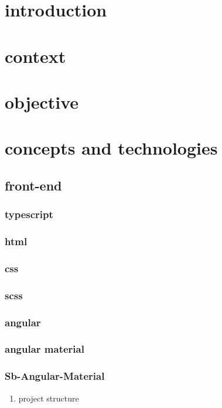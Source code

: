 \documentclass[11pt]{article}
\author{Hydrocat}
\date{\today}
\title{}
\begin{document}
\tableofcontents

\section{introduction}
\label{sec:org0f9d538}
\section{context}
\label{sec:org9407320}
\section{objective}
\label{sec:org6435aa1}
\section{concepts and technologies}
\label{sec:org521768a}
\subsection{front-end}
\label{sec:orgb0a4638}
\subsubsection{typescript}
\label{sec:org8159684}
\subsubsection{html}
\label{sec:org3dd2620}
\subsubsection{css}
\label{sec:org3d714b7}
\subsubsection{scss}
\label{sec:orgeea0674}
\subsubsection{angular}
\label{sec:orgbd0220c}
\subsubsection{angular material}
\label{sec:org23d7eae}
\subsubsection{Sb-Angular-Material}
\label{sec:orge23a323}
\begin{enumerate}
\item project structure
\label{sec:org67d8258}
\end{enumerate}
\end{document}
